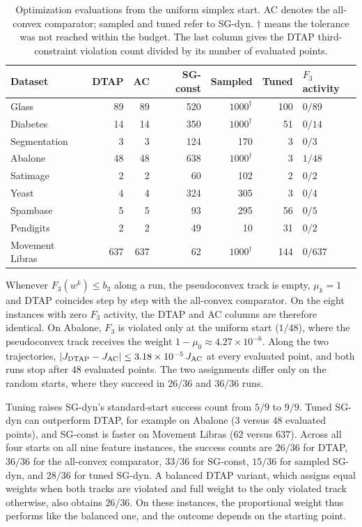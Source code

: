 \documentclass[]{interact}
\theoremstyle{plain}
\theoremstyle{definition}
\theoremstyle{remark}
\begin{document}
\begin{table}[t]
\centering\small
\setlength{\tabcolsep}{4pt}
\caption{Optimization evaluations from the uniform simplex start.
AC denotes the all-convex comparator; sampled and tuned refer to SG-dyn.
$\dagger$ means the tolerance was not reached within the budget.
The last column gives the DTAP third-constraint violation count divided
by its number of evaluated points.}
\label{tab:activation-tuning}
\begin{tabular}{@{}lrrrrrl@{}}
\toprule
Dataset & DTAP & AC & SG-const & Sampled & Tuned & $F_3$ activity\\
\midrule
Glass        & 89 & 89 & 520 & $1000^\dagger$ & 100 & $0/89$\\
Diabetes     & 14 & 14 & 350 & $1000^\dagger$ & 51 & $0/14$\\
Segmentation & 3 & 3 & 124 & 170 & 3 & $0/3$\\
Abalone      & 48 & 48 & 638 & $1000^\dagger$ & 3 & $1/48$\\
Satimage     & 2 & 2 & 60 & 102 & 2 & $0/2$\\
Yeast        & 4 & 4 & 324 & 305 & 3 & $0/4$\\
Spambase     & 5 & 5 & 93 & 295 & 56 & $0/5$\\
Pendigits    & 2 & 2 & 49 & 10 & 31 & $0/2$\\
\midrule
Movement Libras & 637 & 637 & 62 & $1000^\dagger$ & 144 & $0/637$\\
\bottomrule
\end{tabular}
\end{table}

Whenever $F_3(w^k)\le b_3$ along a run, the pseudoconvex track is empty, $\mu_k=1$ and DTAP coincides step by step with the all-convex comparator. On the eight instances with zero $F_3$ activity, the DTAP and AC columns are therefore identical. On Abalone, $F_3$ is violated only at the uniform start ($1/48$), where the pseudoconvex track receives the weight $1-\mu_0\approx4.27\times10^{-6}$. Along the two trajectories, $|J_{\rm DTAP}-J_{\rm AC}|\le3.18\times10^{-5}\,J_{\rm AC}$ at every evaluated point, and both runs stop after $48$ evaluated points. The two assignments differ only on the random starts, where they succeed in $26/36$ and $36/36$ runs.

Tuning raises SG-dyn's standard-start success count from $5/9$ to $9/9$. Tuned SG-dyn can outperform DTAP, for example on Abalone ($3$ versus $48$ evaluated points), and SG-const is faster on Movement Libras ($62$ versus $637$). Across all four starts on all nine feature instances, the success counts are $26/36$ for DTAP, $36/36$ for the all-convex comparator, $33/36$ for SG-const, $15/36$ for sampled SG-dyn, and $28/36$ for tuned SG-dyn. A balanced DTAP variant, which assigns equal weights when both tracks are violated and full weight to the only violated track otherwise, also obtains $26/36$. On these instances, the proportional weight thus performs like the balanced one, and the outcome depends on the starting point.
\end{document}
